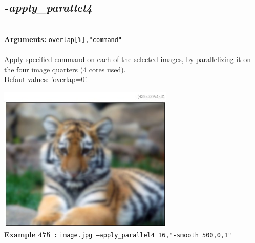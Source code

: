 \documentclass[a4paper,11pt,twoside]{book}
\begin{document}
\subsection{\emph{-apply\_parallel4} }\vspace*{-0.5em}
~\\\textbf{Arguments: } 
{\small \texttt{overlap[\%],"command"}}\\~\\
Apply specified command on each of the selected images, by parallelizing it on the four image quarters (4 cores used).
~\\Defaut values: 'overlap=0'.
\begin{center}\includegraphics[keepaspectratio=true,height=7cm,width=\textwidth]{img/gmic_def475.jpg}\\
{\footnotesize \textbf{Example 475~:} \texttt{image.jpg --apply\_parallel4 16,"-smooth 500,0,1"}}
\end{center}
\end{document}
